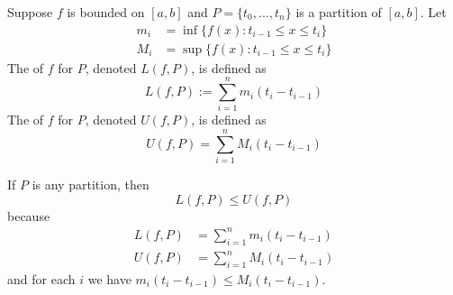 \documentclass[12pt, a4paper, oneside, openright, titlepage]{book}
\begin{document}
\begin{defn}
    Suppose $f$ is bounded on $[a,b]$ and $P = \{t_0,...,t_n\}$ is a partition of $[a,b]$. Let \begin{align}
        m_i &= \inf\{f(x):t_{i-1} \leq x \leq t_i\} \\
        M_i &= \sup\{f(x):t_{i-1}\leq x \leq t_i\}
    \end{align}
    The  of $f$ for $P$, denoted $L(f,P)$, is defined as \begin{equation}
        L(f,P) := \sum\limits_{i=1}^nm_i(t_i-t_{i-1})
    \end{equation}
    The  of $f$ for $P$, denoted $U(f,P)$, is defined as \begin{equation}
        U(f,P) = \sum\limits_{i=1}^nM_i(t_i-t_{i-1})
    \end{equation}
\end{defn}


\begin{rmk}
    If $P$ is any partition, then \begin{equation}
        L(f,P) \leq U(f,P)
    \end{equation}
    because \begin{align*}
        L(f,P) &= \sum\limits_{i=1}^nm_i(t_i-t_{i-1}) \\
        U(f,P) &= \sum\limits_{i=1}^nM_i(t_i - t_{i-1})
    \end{align*}
    and for each $i$ we have $m_i(t_i-t_{i-1}) \leq M_i(t_i-t_{i-1})$.
\end{rmk}
\end{document}
